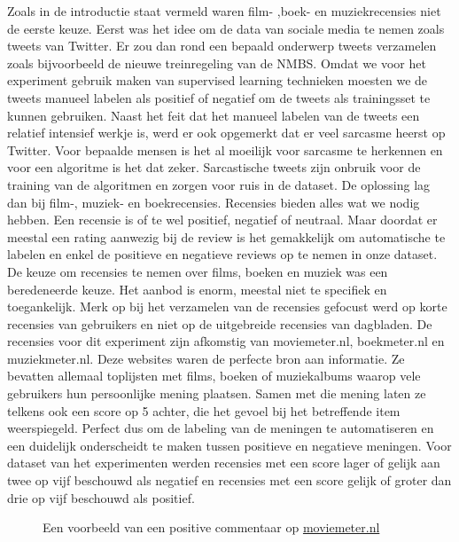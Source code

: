 Zoals in de introductie staat vermeld waren film- ,boek- en muziekrecensies niet de eerste keuze. Eerst was het idee om de data van sociale media te nemen zoals tweets van Twitter. Er zou dan rond een bepaald onderwerp tweets verzamelen zoals bijvoorbeeld de nieuwe treinregeling van de NMBS. Omdat we voor het experiment gebruik maken van supervised learning technieken moesten we de tweets manueel labelen als positief of negatief om de tweets als trainingsset te kunnen gebruiken. Naast het feit dat het manueel labelen van de tweets een relatief intensief werkje is, werd er ook opgemerkt dat er veel sarcasme heerst op Twitter. Voor bepaalde mensen is het al moeilijk voor sarcasme te herkennen en voor een algoritme is het dat zeker. Sarcastische tweets zijn onbruik voor de training van de algoritmen en zorgen voor ruis in de dataset. De oplossing lag dan bij film-, muziek- en boekrecensies. Recensies bieden alles wat we nodig hebben. Een recensie is of te wel positief, negatief of neutraal. Maar doordat er meestal een rating aanwezig bij de review is het gemakkelijk om automatische te labelen en enkel de positieve en negatieve reviews op te nemen in onze dataset. De keuze om recensies te nemen over films, boeken en muziek was een beredeneerde keuze. Het aanbod is enorm, meestal niet te specifiek en toegankelijk. Merk op bij het verzamelen van de recensies gefocust werd op korte recensies van gebruikers en niet op de uitgebreide recensies van dagbladen. De recensies voor dit experiment zijn afkomstig van moviemeter.nl, boekmeter.nl en muziekmeter.nl. Deze websites waren de perfecte bron aan informatie. Ze bevatten allemaal toplijsten met films, boeken of muziekalbums waarop vele gebruikers hun persoonlijke mening plaatsen. Samen met die mening laten ze telkens ook een score op 5 achter, die het gevoel bij het betreffende item weerspiegeld. Perfect dus om de labeling van de meningen te automatiseren en een duidelijk onderscheidt te maken tussen positieve en negatieve meningen. Voor dataset van het experimenten werden recensies met een score lager of gelijk aan twee op vijf beschouwd als negatief en recensies met een score gelijk of groter dan drie op vijf beschouwd als positief.\\

\begin{figure}[h]%
    \centering
    \caption{Een voorbeeld van een positive commentaar op \url{moviemeter.nl}}%
\end{figure}


